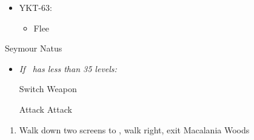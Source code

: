\begin{encounters}
    \begin{itemize}
        \item YKT-63:
        \begin{itemize}
            \tidusf Attack
            \yunaf Attack
            \item Flee
        \end{itemize}
    \end{itemize}
\end{encounters}
\begin{battle}[36000]{Seymour Natus}
    \begin{itemize}
        \item \textit{If \lulu\ has less than 35 levels:}
        \begin{itemize}
            \switch{\tidus}{\lulu}
            \luluf Switch Weapon
            \switch{\lulu}{\tidus}
        \end{itemize}
        \tidusf Attack
        \summon{\bahamut}
        \bahamutf Attack
    \end{itemize}
\end{battle}
\begin{enumerate}[resume]
    \item Walk down two screens to \yuna, walk right, exit Macalania Woods
\end{enumerate}
